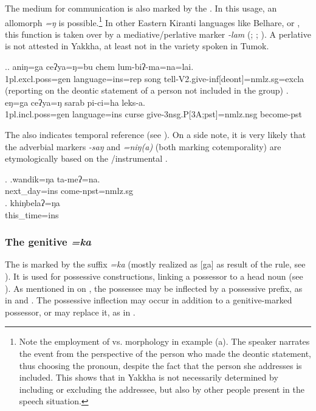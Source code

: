 		
The medium for communication is also marked by the  \Next. In this usage, an allomorph \emph{=ŋ} is possible.\footnote{Note the employment of  vs.  morphology in example (a). The speaker narrates the event from the perspective of the person who made the deontic statement, thus choosing the  pronoun, despite the fact that the person she addresses is included. This shows that  in Yakkha is not necessarily determined by including or excluding the addressee, but also by other people present in the speech situation.} In other Eastern Kiranti languages like Belhare,  or , this function is taken over by a mediative/perlative marker \emph{-lam} (\citealt[549]{Bickel2003Belhare}; \citealt[83]{Schikowski2012_Morphology}; \citealt[51]{Driem1987A-grammar}). A perlative  is not attested in Yakkha, at least not in the variety spoken in Tumok.

\ex.\ag. aniŋ=ga ceʔya=ŋ=bu chem lum-biʔ-ma=na=lai.\\
{\sc 1pl.excl.poss=gen} language{\sc =ins=rep} song tell{\sc -V2.give-inf[deont]=nmlz.sg=excla}\\
 (reporting on the deontic statement of a person not included in the group) 
\bg. eŋ=ga            ceʔya=ŋ       sarab pi-ci=ha leks-a.\\
		{\sc 1pl.incl.poss=gen} language{\sc =ins} curse give{\sc -3nsg.P[3A;pst]=nmlz.nsg} become{\sc [3sg]-pst}\\
		
		
The  also indicates temporal reference (see \Next). On a side note,  it is very likely that the adverbial  markers  \emph{-saŋ} and \emph{=niŋ(a)} (both marking cotemporality)  are  etymologically based on the /instrumental .
		
		\ex. \ag.wandik=ŋa ta-meʔ=na.\\
		next\_day{\sc =ins} come{\sc [3sg]-npst=nmlz.sg}\\
		\bg. khiŋbelaʔ=ŋa\\
		this\_time{\sc =ins}\\
	
	
\subsubsection{The genitive \emph{=ka} }\label{case-gen}		
The   is marked by the suffix \emph{=ka} (mostly realized as [ga] as  result of the  rule, see ). It is used for possessive constructions, linking a possessor to a head noun (see \Next). As mentioned in  on , the possessee may be inflected by a possessive prefix, as in \Next[b] and \Next[c]. The possessive inflection may occur in addition to a genitive-marked possessor, or may replace it, as in \Next[c].

